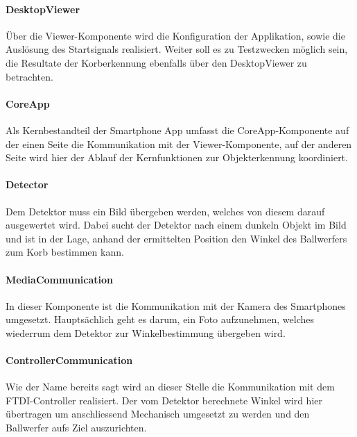 		\paragraph{DesktopViewer}
		Über die Viewer-Komponente wird die Konfiguration der Applikation, sowie die Auslösung des Startsignals realisiert. Weiter soll es zu Testzwecken möglich sein, die Resultate der Korberkennung ebenfalls über den DesktopViewer zu betrachten.
		
		\paragraph{CoreApp}
		Als Kernbestandteil der Smartphone App umfasst die CoreApp-Komponente auf der einen Seite die Kommunikation mit der Viewer-Komponente, auf der anderen Seite wird hier der Ablauf der Kernfunktionen zur Objekterkennung koordiniert.
		
		\paragraph{Detector}
		Dem Detektor muss ein Bild übergeben werden, welches von diesem darauf ausgewertet wird. Dabei sucht der Detektor nach einem dunkeln Objekt im Bild und ist in der Lage, anhand der ermittelten Position den Winkel des Ballwerfers zum Korb bestimmen kann.
		
		\paragraph{MediaCommunication}
		In dieser Komponente ist die Kommunikation mit der Kamera des Smartphones umgesetzt. Hauptsächlich geht es darum, ein Foto aufzunehmen, welches wiederrum dem Detektor zur Winkelbestimmung übergeben wird.
		
		\paragraph{ControllerCommunication}
		Wie der Name bereits sagt wird an dieser Stelle die Kommunikation mit dem FTDI-Controller realisiert. Der vom Detektor berechnete Winkel wird hier übertragen um anschliessend Mechanisch umgesetzt zu werden und den Ballwerfer aufs Ziel auszurichten.
		
